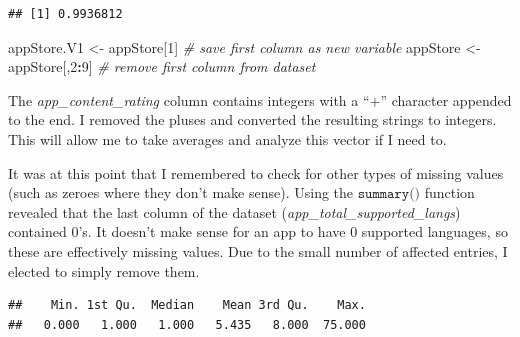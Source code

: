 \documentclass[]{article}
\newenvironment{Shaded}{\begin{snugshade}}{\end{snugshade}}
\newcommand{\KeywordTok}[1]{\textcolor[rgb]{0.13,0.29,0.53}{\textbf{#1}}}
\newcommand{\DecValTok}[1]{\textcolor[rgb]{0.00,0.00,0.81}{#1}}
\newcommand{\CharTok}[1]{\textcolor[rgb]{0.31,0.60,0.02}{#1}}
\newcommand{\StringTok}[1]{\textcolor[rgb]{0.31,0.60,0.02}{#1}}
\newcommand{\CommentTok}[1]{\textcolor[rgb]{0.56,0.35,0.01}{\textit{#1}}}
\newcommand{\OperatorTok}[1]{\textcolor[rgb]{0.81,0.36,0.00}{\textbf{#1}}}
\newcommand{\NormalTok}[1]{#1}
\begin{document}
\begin{verbatim}
## [1] 0.9936812
\end{verbatim}

\begin{Shaded}
\begin{Highlighting}[]
\NormalTok{appStore.V1 <-}\StringTok{ }\NormalTok{appStore[}\DecValTok{1}\NormalTok{]                }\CommentTok{# save first column as new variable}
\NormalTok{appStore <-}\StringTok{ }\NormalTok{appStore[,}\DecValTok{2}\OperatorTok{:}\DecValTok{9}\NormalTok{]                }\CommentTok{# remove first column from dataset}
\end{Highlighting}
\end{Shaded}

The \emph{app\_content\_rating} column contains integers with a ``+''
character appended to the end. I removed the pluses and converted the
resulting strings to integers. This will allow me to take averages and
analyze this vector if I need to.

\begin{Shaded}
\end{Shaded}

It was at this point that I remembered to check for other types of
missing values (such as zeroes where they don't make sense). Using the
\(\texttt{summary()}\) function revealed that the last column of the
dataset (\emph{app\_total\_supported\_langs}) contained 0's. It doesn't
make sense for an app to have 0 supported languages, so these are
effectively missing values. Due to the small number of affected entries,
I elected to simply remove them.

\begin{Shaded}
\end{Shaded}

\begin{verbatim}
##    Min. 1st Qu.  Median    Mean 3rd Qu.    Max. 
##   0.000   1.000   1.000   5.435   8.000  75.000
\end{verbatim}
\end{document}
